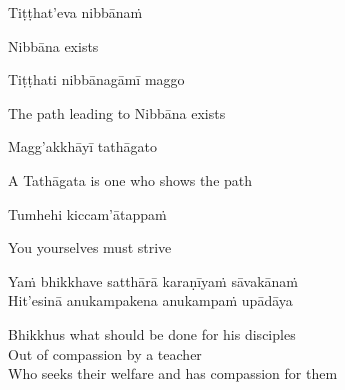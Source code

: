 \suttaRef{[Dhp 212]}

\ifninebythirteen\clearpage\fi

\begin{verses}
  Tiṭṭhat'eva nibbānaṁ
\end{verses}

\begin{english}
  Nibbāna exists
\end{english}

\begin{verses}
  Tiṭṭhati nibbānagāmī maggo
\end{verses}

\begin{english}
  The path leading to Nibbāna exists
\end{english}

\ifninebythirteen\enlargethispage{1\baselineskip}\fi

\begin{verses}
  Magg'akkhāyī tathāgato
\end{verses}

\begin{english}
  A Tathāgata is one who shows the path
\end{english}

\suttaRef{[MN 107]}

\begin{verses}
  Tumhehi kiccam'ātappaṁ
\end{verses}

\begin{english}
  You yourselves must strive
\end{english}

\suttaRef{[Dhp 276]}

\ifninebythirteen\vspace{0.2cm}\fi

\ifbfive\clearpage\fi

\begin{verses}
  Yaṁ bhikkhave satthārā karaṇīyaṁ sāvakānaṁ\\
  Hit'esinā anukampakena anukampaṁ upādāya
\end{verses}

\ifafive\clearpage\fi

\begin{english-verses}
  Bhikkhus what should be done for his disciples\\
  Out of compassion by a teacher\\
  Who seeks their welfare and has compassion for them
\end{english-verses}

